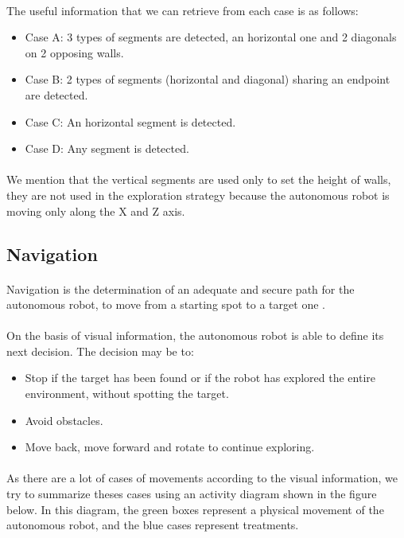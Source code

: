 \documentclass[12pt]{report}
\begin{document}
 \paragraph{}
 The useful information that we can retrieve from each case is as follows:
 \begin{itemize}
 	\item Case A: 3 types of segments are detected, an horizontal one and 2 diagonals on 2 opposing walls.
 	\item Case B: 2 types of segments (horizontal and diagonal) sharing an endpoint are detected.
 	\item Case C: An horizontal segment is detected.
 	\item Case D: Any segment is detected.
 	
 \end{itemize}
 \paragraph{}
 We mention that the vertical segments are used only to set the height of walls, they are not used in the exploration strategy because the autonomous robot is moving only along the X and Z axis.
 \subsection{Navigation}
     \paragraph{}
 Navigation is the determination of an adequate and secure path for the autonomous robot, to move from a starting spot to a target one \cite{bonin-font_visual_2008}.
 \paragraph{}
 On the basis of visual information, the autonomous robot is able to define its next decision. The decision may be to:
 \begin{itemize}
 	\item Stop if the target has been found or if the robot has explored the entire environment, without spotting the target.
 	\item Avoid obstacles.
 	\item Move back, move forward and rotate to continue exploring.
 \end{itemize}
\paragraph{}
As there are a lot of cases of movements according to the visual information, we try to summarize theses cases using an activity diagram shown in the figure below. In this diagram, the green boxes represent a physical movement of the autonomous robot, and the blue cases represent treatments. 
\end{document}
